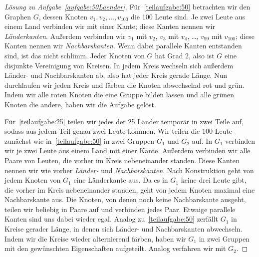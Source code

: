 \begin{proof}[Lösung zu Aufgabe~\ref{aufgabe:50Laender}]
	Für~\ref{teilaufgabe:50} betrachten wir den Graphen $G$, dessen Knoten $v_1,v_2,\dotsc,v_{100}$ die 100 Leute sind. Je zwei Leute aus einem Land verbinden wir mit einer Kante; diese Kanten nennen wir \emph{Länderkanten}. Außerdem verbinden wir $v_1$ mit $v_2$, $v_3$ mit $v_4$, \ldots, $v_{99}$ mit $v_{100}$; diese Kanten nennen wir \emph{Nachbarskanten}. Wenn dabei parallele Kanten entstanden sind, ist das nicht schlimm. Jeder Knoten von $G$ hat Grad $2$, also ist $G$ eine disjunkte Vereinigung von Kreisen. In jedem Kreis wechseln sich außerdem Länder- und Nachbarskanten ab, also hat jeder Kreis gerade Länge. Nun durchlaufen wir jeden Kreis und färben die Knoten abwechselnd rot und grün. Indem wir alle roten Knoten die eine Gruppe bilden lassen und alle grünen Knoten die andere, haben wir die Aufgabe gelöst.
	
	Für~\ref{teilaufgabe:25} teilen wir jedes der 25 Länder temporär in zwei Teile auf, sodass aus jedem Teil genau zwei Leute kommen. Wir teilen die 100 Leute zunächst wie in~\ref{teilaufgabe:50} in zwei Gruppen $G_1$ und $G_2$ auf. In $G_1$ verbinden wir je zwei Leute aus einem Land mit einer Kante. Außerdem verbinden wir alle Paare von Leuten, die vorher im Kreis nebeneinander standen. Diese Kanten nennen wir wie vorher \emph{Länder-} und \emph{Nachbarskanten}. Nach Konstruktion geht von jedem Knoten von $G_1$ eine Länderkante aus. Da es in $G_1$ keine drei Leute gibt, die vorher im Kreis nebeneinander standen, geht von jedem Knoten maximal eine Nachbarskante aus. Die Knoten, von denen noch keine Nachbarskante ausgeht, teilen wir beliebig in Paare auf und verbinden jedes Paar. Etwaige parallele Kanten sind uns dabei wieder egal. Analog zu~\ref{teilaufgabe:50} zerfällt $G_1$ in Kreise gerader Länge, in denen sich Länder- und Nachbarskanten abwechseln. Indem wir die Kreise wieder alternierend färben, haben wir $G_1$ in zwei Gruppen mit den gewünschten Eigenschaften aufgeteilt. Analog verfahren wir mit $G_2$.
\end{proof}

